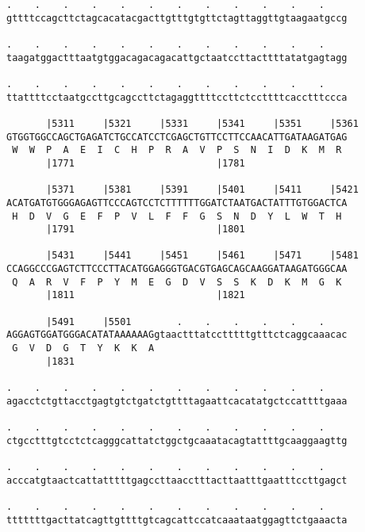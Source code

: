 \documentclass{article}
\begin{document}
\begin{Verbatim}
.    .    .    .    .    .    .    .    .    .    .    .    
gttttccagcttctagcacatacgacttgtttgtgttctagttaggttgtaagaatgccg
                                                            
.    .    .    .    .    .    .    .    .    .    .    .    
taagatggactttaatgtggacagacagacattgctaatccttacttttatatgagtagg
                                                            
.    .    .    .    .    .    .    .    .    .    .    .    
ttattttcctaatgccttgcagccttctagaggttttccttctccttttcacctttccca
                                                            
       |5311     |5321     |5331     |5341     |5351     |5361
GTGGTGGCCAGCTGAGATCTGCCATCCTCGAGCTGTTCCTTCCAACATTGATAAGATGAG
 W  W  P  A  E  I  C  H  P  R  A  V  P  S  N  I  D  K  M  R 
       |1771                         |1781                  
  
       |5371     |5381     |5391     |5401     |5411     |5421
ACATGATGTGGGAGAGTTCCCAGTCCTCTTTTTTGGATCTAATGACTATTTGTGGACTCA
 H  D  V  G  E  F  P  V  L  F  F  G  S  N  D  Y  L  W  T  H 
       |1791                         |1801                  
  
       |5431     |5441     |5451     |5461     |5471     |5481
CCAGGCCCGAGTCTTCCCTTACATGGAGGGTGACGTGAGCAGCAAGGATAAGATGGGCAA
 Q  A  R  V  F  P  Y  M  E  G  D  V  S  S  K  D  K  M  G  K 
       |1811                         |1821                  
  
       |5491     |5501        .    .    .    .    .    .    
AGGAGTGGATGGGACATATAAAAAAGgtaactttatcctttttgtttctcaggcaaacac
 G  V  D  G  T  Y  K  K  A                                  
       |1831                                                
  
.    .    .    .    .    .    .    .    .    .    .    .    
agacctctgttacctgagtgtctgatctgttttagaattcacatatgctccattttgaaa
                                                            
.    .    .    .    .    .    .    .    .    .    .    .    
ctgcctttgtcctctcagggcattatctggctgcaaatacagtattttgcaaggaagttg
                                                            
.    .    .    .    .    .    .    .    .    .    .    .    
acccatgtaactcattatttttgagccttaacctttacttaatttgaatttccttgagct
                                                            
.    .    .    .    .    .    .    .    .    .    .    .    
tttttttgacttatcagttgttttgtcagcattccatcaaataatggagttctgaaacta
                                                            

\end{Verbatim}
\end{document}
